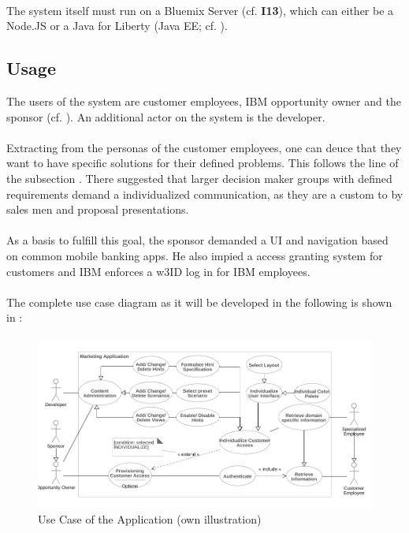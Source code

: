 \paragraph{} The system itself must run on a Bluemix Server (cf. \textbf{I13}), which can either be a Node.JS or a Java for Liberty (Java EE; cf. \cite{}). 

\subsection{Usage}
The users of the system are customer employees, IBM opportunity owner and the sponsor (cf. \cpageref{}). An additional actor on the system is the developer. 

\paragraph{} Extracting from the personas of the customer employees, one can deuce that they want to have specific solutions for their defined problems. This follows the line of the subsection . There \textcite[21]{Backhaus.2015b} suggested that larger decision maker groups with defined requirements demand a individualized communication, as they are a custom to by sales men and proposal presentations. 

\paragraph{} As a basis to fulfill this goal, the sponsor demanded a UI and navigation based on common mobile banking apps. He also impied a access granting system for customers and IBM enforces a w3ID log in for IBM employees.

\paragraph{}
The complete use case diagram as it will be developed in the following is shown in :
\paragraph{}
\begin{figure}[H]
    \centering
    \includegraphics[width=\textwidth]{img/diagrams/UseCase.png}
    \caption[Use Case of the Application]{Use Case of the Application (own illustration)}
    \label{fig:ucucuc}
\end{figure}


